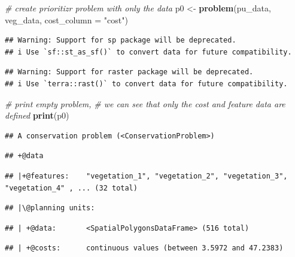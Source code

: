 \documentclass[12pt,]{book}
\newenvironment{Shaded}{\begin{snugshade}}{\end{snugshade}}
\newcommand{\CommentTok}[1]{\textcolor[rgb]{0.56,0.35,0.01}{\textit{#1}}}
\newcommand{\DataTypeTok}[1]{\textcolor[rgb]{0.13,0.29,0.53}{#1}}
\newcommand{\KeywordTok}[1]{\textcolor[rgb]{0.13,0.29,0.53}{\textbf{#1}}}
\newcommand{\NormalTok}[1]{#1}
\newcommand{\StringTok}[1]{\textcolor[rgb]{0.31,0.60,0.02}{#1}}
\begin{document}
\begin{Shaded}
\begin{Highlighting}[]
\CommentTok{# create prioritizr problem with only the data}
\NormalTok{p0 <-}\StringTok{ }\KeywordTok{problem}\NormalTok{(pu_data, veg_data, }\DataTypeTok{cost_column =} \StringTok{"cost"}\NormalTok{)}
\end{Highlighting}
\end{Shaded}

\begin{verbatim}
## Warning: Support for sp package will be deprecated.
## i Use `sf::st_as_sf()` to convert data for future compatibility.
\end{verbatim}

\begin{verbatim}
## Warning: Support for raster package will be deprecated.
## i Use `terra::rast()` to convert data for future compatibility.
\end{verbatim}

\begin{Shaded}
\begin{Highlighting}[]
\CommentTok{# print empty problem,}
\CommentTok{# we can see that only the cost and feature data are defined}
\KeywordTok{print}\NormalTok{(p0)}
\end{Highlighting}
\end{Shaded}

\begin{verbatim}
## A conservation problem (<ConservationProblem>)
\end{verbatim}

\begin{verbatim}
## +@data
\end{verbatim}

\begin{verbatim}
## |+@features:    "vegetation_1", "vegetation_2", "vegetation_3", "vegetation_4" , ... (32 total)
\end{verbatim}

\begin{verbatim}
## |\@planning units:
\end{verbatim}

\begin{verbatim}
## | +@data:       <SpatialPolygonsDataFrame> (516 total)
\end{verbatim}

\begin{verbatim}
## | +@costs:      continuous values (between 3.5972 and 47.2383)
\end{verbatim}
\end{document}
